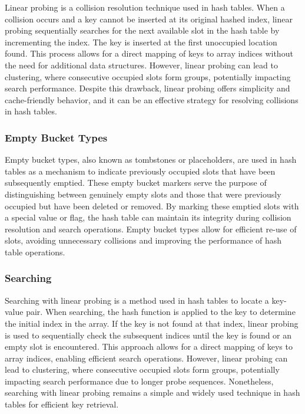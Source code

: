 Linear probing is a collision resolution technique used in hash tables. When a collision occurs and a key cannot be inserted at its original hashed index, linear probing sequentially searches for the next available slot in 
the hash table by incrementing the index. The key is inserted at the first unoccupied location found. This process allows for a direct mapping of keys to array indices without the need for additional data structures. However, 
linear probing can lead to clustering, where consecutive occupied slots form groups, potentially impacting search performance. Despite this drawback, linear probing offers simplicity and cache-friendly behavior, and it can be 
an effective strategy for resolving collisions in hash tables.

\subsubsection{Empty Bucket Types}

Empty bucket types, also known as tombstones or placeholders, are used in hash tables as a mechanism to indicate previously occupied slots that have been subsequently emptied. These empty bucket markers serve the purpose of 
distinguishing between genuinely empty slots and those that were previously occupied but have been deleted or removed. By marking these emptied slots with a special value or flag, the hash table can maintain its integrity 
during collision resolution and search operations. Empty bucket types allow for efficient re-use of slots, avoiding unnecessary collisions and improving the performance of hash table operations.

\subsubsection{Searching}

Searching with linear probing is a method used in hash tables to locate a key-value pair. When searching, the hash function is applied to the key to determine the initial index in the array. If the key is not found at that 
index, linear probing is used to sequentially check the subsequent indices until the key is found or an empty slot is encountered. This approach allows for a direct mapping of keys to array indices, enabling efficient search 
operations. However, linear probing can lead to clustering, where consecutive occupied slots form groups, potentially impacting search performance due to longer probe sequences. Nonetheless, searching with linear probing remains 
a simple and widely used technique in hash tables for efficient key retrieval.

